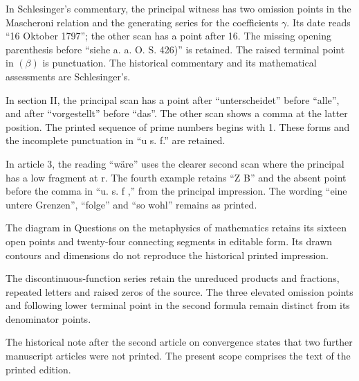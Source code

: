 In Schlesinger’s commentary, the principal witness has two omission points in the Mascheroni relation and the generating series for the coefficients \(\gamma\). Its date reads “16 Oktober 1797”; the other scan has a point after 16. The missing opening parenthesis before “siehe a. a. O. S. 426)” is retained. The raised terminal point in \((\beta)\) is punctuation. The historical commentary and its mathematical assessments are Schlesinger’s.

In section II, the principal scan has a point after “unterscheidet” before “alle”, and after “vorgestellt” before “das”. The other scan shows a comma at the latter position. The printed sequence of prime numbers begins with 1. These forms and the incomplete punctuation in “u s. f.” are retained.

In article 3, the reading “wäre” uses the clearer second scan where the principal has a low fragment at r. The fourth example retains “Z B” and the absent point before the comma in “u. s. f ,” from the principal impression. The wording “eine untere Grenzen”, “folge” and “so wohl” remains as printed.







The diagram in Questions on the metaphysics of mathematics retains its sixteen open points and twenty-four connecting segments in editable form. Its drawn contours and dimensions do not reproduce the historical printed impression.

The discontinuous-function series retain the unreduced products and fractions, repeated letters and raised zeros of the source. The three elevated omission points and following lower terminal point in the second formula remain distinct from its denominator points.



The historical note after the second article on convergence states that two further manuscript articles were not printed. The present scope comprises the text of the printed edition.
































